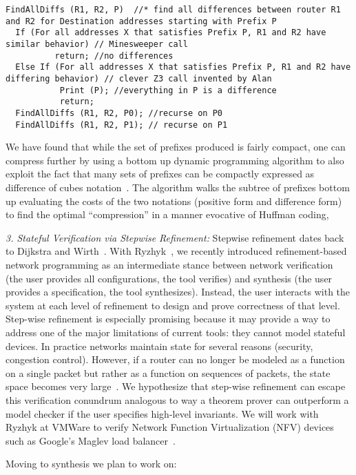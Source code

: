 \begin{verbatim}
FindAllDiffs (R1, R2, P)  //* find all differences between router R1 and R2 for Destination addresses starting with Prefix P
  If (For all addresses X that satisfies Prefix P, R1 and R2 have similar behavior) // Minesweeper call
          return; //no differences
  Else If (For all addresses X that satisfies Prefix P, R1 and R2 have differing behavior) // clever Z3 call invented by Alan
           Print (P); //everything in P is a difference
           return;
  FindAllDiffs (R1, R2, P0); //recurse on P0
  FindAllDiffs (R1, R2, P1); // recurse on P1
\end{verbatim}

We have found that while the set of prefixes produced is fairly compact, one can compress further by using a bottom
up dynamic programming algorithm to also exploit the fact that many sets of prefixes can be compactly expressed
as difference of cubes notation~\cite{hsa, nod}.  The algorithm walks the subtree of prefixes bottom up evaluating the
costs of the two notations (positive form and difference form) to find the optimal ``compression'' in a manner
evocative of Huffman coding,

{\em 3. Stateful Verification via Stepwise Refinement:} Stepwise refinement dates back to Dijkstra and Wirth~\cite{wirth}. With Ryzhyk~\cite{leonid}, we recently introduced refinement-based network programming as an intermediate stance between network verification (the user provides all configurations, the tool verifies) and synthesis (the user provides a specification, the tool synthesizes).  Instead, the user interacts with the system at each level of refinement to design and prove correctness of that level.
%
Step-wise refinement is especially promising because it may provide a way to address one of the major limitations of current tools: they cannot model stateful devices. In practice networks maintain state for several reasons (security, congestion control). However, if a router can  no longer be modeled as a function on a single packet but rather as a function on sequences of packets, the state space becomes very large~\cite{mooly-tacas16}.  We hypothesize that step-wise refinement can escape this verification conundrum analogous to way a theorem prover can outperform a model checker if the user specifies high-level invariants.   We will work with Ryzhyk at VMWare to verify Network Function Virtualization (NFV) devices such as Google's Maglev load balancer~\cite{maglev}. 

Moving to synthesis we plan to work on:

